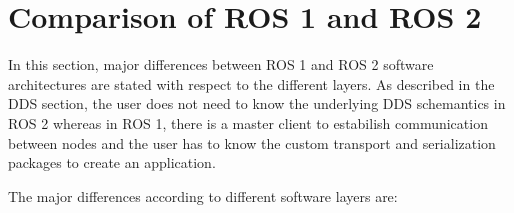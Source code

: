 \documentclass[%
xelatex,
	oneside,		%
	12pt,			%
	parskip=half,	%
	abstracton,
	chapterprefix=true%
    appendixprefix=true]
{scrbook}
\begin{document}
	\section{Comparison of ROS 1 and ROS 2}	
	
	\vspace*{0.5cm}
In this section, major differences between ROS 1 and ROS 2 software architectures are stated with respect to the different layers. As described in the DDS section, the user does not need to know the underlying DDS schemantics in ROS 2 whereas in ROS 1, there is a master client to estabilish communication between nodes and the user has to know the custom transport and serialization packages to create an application. 


The major differences according to different software layers are:
\end{document}
